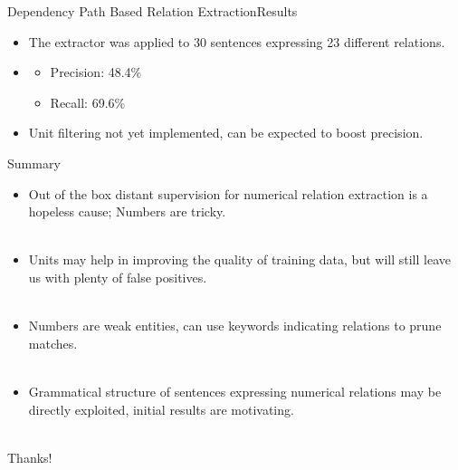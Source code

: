\documentclass{beamer}
\begin{document}
\begin{frame}{Dependency Path Based Relation Extraction}{Results}
\begin{itemize}
\item The extractor was applied to 30 sentences expressing 23 different relations. \\

\item {}

 \begin{itemize}
  \item Precision: 48.4\%
  \item Recall: 69.6\%
 \end{itemize}

\item Unit filtering not yet implemented, can be expected to boost precision.
\end{itemize}

\end{frame}

\begin{frame}{Summary}
\begin{itemize}
 \item Out of the box distant supervision for numerical relation extraction is a hopeless cause; Numbers are tricky. \\~\\
 \item Units may help in improving the quality of training data, but will still leave us with plenty of false positives. \\~\\
 \item Numbers are weak entities, can use keywords indicating relations to prune matches. \\~\\
 \item Grammatical structure of sentences expressing numerical relations may be directly exploited, initial results are motivating. \\~\\
\end{itemize}

\end{frame}

\begin{frame}[plain,c]

\begin{center}
\Huge Thanks!
\end{center}

\end{frame}
\end{document}
